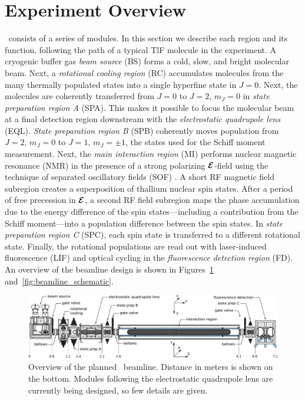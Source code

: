 \section{Experiment Overview}
\label{sec:experimental_overview}
\CENTREX\ consists of a series of modules. %
In this section we describe each region and its function, following the path of a typical TlF molecule in the experiment. A cryogenic buffer gas \emph{beam source} (BS) forms a cold, slow, and bright molecular beam. Next, a \emph{rotational cooling region} (RC) accumulates molecules from the many thermally populated %
states into a single hyperfine state in $J=0$.
Next, the molecules are coherently transferred from $J=0$ to $J=2,\,m_J=0$ in \emph{state preparation region A} (SPA). This makes it possible to focus the molecular beam at a final detection region downstream with the \emph{electrostatic quadrupole lens} (EQL). \emph{State preparation region B} (SPB) coherently moves population from $J=2,\,m_J=0$ to $J=1,\,m_J=\pm 1$, the states used for the Schiff moment measurement. Next, the \emph{main interaction region} (MI) performs nuclear magnetic resonance (NMR) in the presence of a strong polarizing $\bm{\mathcal{E}}$-field using the technique of separated oscillatory fields (SOF) \cite{PhysRev.78.695,ramsey1951phase}. A short RF magnetic field subregion creates a superposition of thallium nuclear spin states. After a period of free precession in $\bm{\mathcal{E}}$, a second RF field subregion maps the phase accumulation due to the energy difference of the spin states---including a contribution from the Schiff moment---into a population difference between the spin states. In \emph{state preparation region C} (SPC), each spin state is transferred to a different rotational state. Finally, the rotational populations are read out with laser-induced fluorescence (LIF) and optical cycling in the \emph{fluorescence detection region} (FD). An overview of the beamline design is shown in Figures~\ref{fig:beamline} and~\ref{fig:beamline_schematic}.
\begin{figure}
	\centering
	\includegraphics[width=\textwidth]{figs/svg/beamline_v2.pdf}
	\caption{Overview of the planned \CENTREX\ beamline. Distance in meters is shown on the bottom. Modules following the electrostatic quadrupole lens are currently being designed, so few details are given.}
	\label{fig:beamline}
\end{figure}
